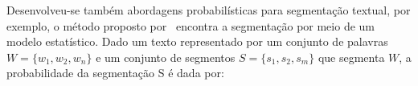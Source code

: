 \documentclass[10pt,a4paper]{article}
\begin{document}
Desenvolveu-se também abordagens probabilísticas para segmentação textual, por exemplo, o método proposto por~\cite{UtiamaXXXX} encontra a segmentação por meio de um modelo estatístico.
%
Dado um texto representado por um conjunto de palavras 
$W = \{w_1, w_2, w_n\}$ e um conjunto de segmentos $S = \{s_1, s_2, s_m\}$ que segmenta $W$, a probabilidade da segmentação S é dada por:





\end{document}
